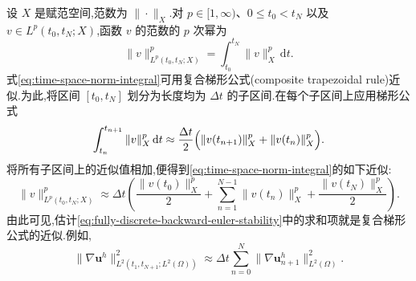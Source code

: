 \begin{note}[时空范数的近似]
\label{note:time-space-norm-approximation}
设 $X$ 是赋范空间,范数为 $\|\cdot\|_X$.对 $p\in[1,\infty)$、$0\le t_0<t_N$ 以及 $v\in L^p(t_0,t_N;X)$,函数 $v$ 的范数的 $p$ 次幂为
\begin{equation}\label{eq:time-space-norm-integral}
  \|v\|_{L^p(t_0,t_N;X)}^p
    =\int_{t_0}^{t_N}\|v\|_X^p\,\mathrm{d}t.
\end{equation}
式\cref{eq:time-space-norm-integral}可用复合梯形公式(composite trapezoidal rule)近似.为此,将区间 $[t_0,t_N]$ 划分为长度均为 $\Delta t$ 的子区间.在每个子区间上应用梯形公式
\[
  \int_{t_n}^{t_{n+1}}\|v\|_X^p\,\mathrm{d}t
    \approx\frac{\Delta t}{2}
       \Bigl(\|v(t_{n+1})\|_X^p+\|v(t_n)\|_X^p\Bigr).
\]
将所有子区间上的近似值相加,便得到\cref{eq:time-space-norm-integral}的如下近似:
\[
  \|v\|_{L^p(t_0,t_N;X)}^p
    \approx\Delta t\left(
       \frac{\|v(t_0)\|_X^p}{2}
       +\sum_{n=1}^{N-1}\|v(t_n)\|_X^p
       +\frac{\|v(t_N)\|_X^p}{2}\right).
\]
由此可见,估计\cref{eq:fully-discrete-backward-euler-stability}中的求和项就是复合梯形公式的近似.例如,
\[
  \|\nabla\bm{u}^h\|_{L^2(t_1,t_{N+1};L^2(\Omega))}^2
    \approx\Delta t\sum_{n=0}^{N}
       \|\nabla\bm{u}_{n+1}^h\|_{L^2(\Omega)}^2.
\]
\end{note}

